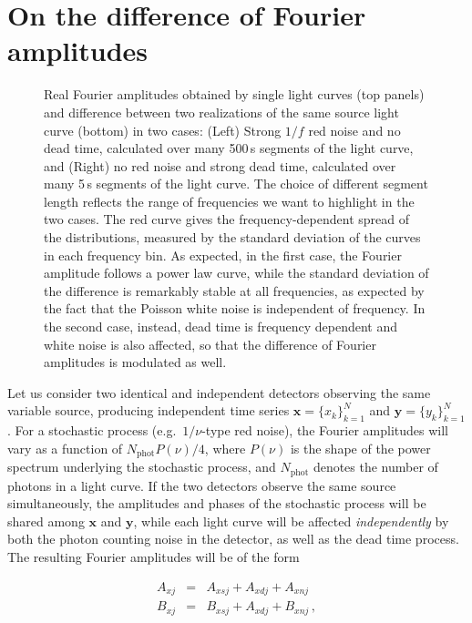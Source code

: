 \documentclass[twocolumn]{aastex61}
\begin{document}
\section{On the difference of Fourier amplitudes} \label{sec:fourierdiff}
\begin{figure*}
\caption{Real Fourier amplitudes obtained by single light curves (top panels) and difference between two realizations of the same source light curve (bottom) in two cases: (Left) Strong $1/f$ red noise and no dead time, calculated over many 500\,s segments of the light curve, and (Right) no red noise and strong dead time, calculated over many 5\,s segments of the light curve. 
The choice of different segment length reflects the range of frequencies we want to highlight in the two cases.
The red curve gives the frequency-dependent spread of the distributions, measured by the standard deviation of the curves in each frequency bin. 
As expected, in the first case, the Fourier amplitude follows a power law curve, while the standard deviation of the difference is remarkably stable at all frequencies, as expected by the fact that the Poisson white noise is independent of frequency. 
In the second case, instead, dead time is frequency dependent and white noise is also affected, so that the difference of Fourier amplitudes is modulated as well.}
\label{fig:fourierdiff}
\end{figure*}

Let us consider two identical and independent detectors observing the same variable source, producing independent time series $\mathbf{x} = \{x_k\}_{k=1}^N$ and $\mathbf{y} = \{y_k\}_{k=1}^N$. For a stochastic process (e.g.\ $1/\nu$-type red noise), the Fourier amplitudes will vary as a function of $N_{\mathrm{phot}}P(\nu)/4$, where $P(\nu)$ is the shape of the power spectrum underlying the stochastic process, and $N_{\mathrm{phot}}$ denotes the number of photons in a light curve. If the two detectors observe the same source simultaneously, the amplitudes and phases of the stochastic process will be shared among $\mathbf{x}$ and $\mathbf{y}$, while each light curve will be affected \textit{independently} by both the photon counting noise in the detector, as well as the dead time process. The resulting Fourier amplitudes will be of the form

\begin{eqnarray}
A_{xj} &=& A_{xsj} + A_{xdj} + A_{xnj} \nonumber \\
B_{xj} &=& B_{xsj} + A_{xdj} + B_{xnj} \, ,
\end{eqnarray}
\end{document}

